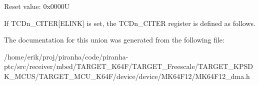 Reset value\+: 0x0000U

If T\+C\+Dn\+\_\+\+C\+I\+T\+ER\mbox{[}E\+L\+I\+NK\mbox{]} is set, the T\+C\+Dn\+\_\+\+C\+I\+T\+ER register is defined as follows. 

The documentation for this union was generated from the following file\+:\begin{DoxyCompactItemize}
\item 
/home/erik/proj/piranha/code/piranha-\/ptc/src/receiver/mbed/\+T\+A\+R\+G\+E\+T\+\_\+\+K64\+F/\+T\+A\+R\+G\+E\+T\+\_\+\+Freescale/\+T\+A\+R\+G\+E\+T\+\_\+\+K\+P\+S\+D\+K\+\_\+\+M\+C\+U\+S/\+T\+A\+R\+G\+E\+T\+\_\+\+M\+C\+U\+\_\+\+K64\+F/device/device/\+M\+K64\+F12/M\+K64\+F12\+\_\+dma.\+h\end{DoxyCompactItemize}
